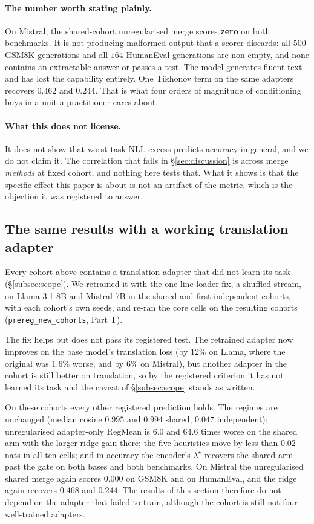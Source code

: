 \paragraph{The number worth stating plainly.} On Mistral, the shared-cohort
unregularised merge scores \textbf{zero} on both benchmarks. It is not
producing malformed output that a scorer discards: all $500$ GSM8K generations
and all $164$ HumanEval generations are non-empty, and none contains an
extractable answer or passes a test. The model generates fluent text and has
lost the capability entirely. One Tikhonov term on the same adapters recovers
$0.462$ and $0.244$. That is what four orders of magnitude of conditioning buys
in a unit a practitioner cares about.

\paragraph{What this does not license.} It does not show that worst-task NLL
excess predicts accuracy in general, and we do not claim it. The correlation
that fails in \S\ref{sec:discussion} is across merge \emph{methods} at fixed
cohort, and nothing here tests that. What it shows is that the specific effect
this paper is about is not an artifact of the metric, which is the objection it
was registered to answer.


\subsection{The same results with a working translation adapter}
\label{subsec:translation-fix}

Every cohort above contains a translation adapter that did not learn its task
(\S\ref{subsec:scope}). We retrained it with the one-line loader fix, a
shuffled stream, on Llama-3.1-8B and Mistral-7B in the shared and first
independent cohorts, with each cohort's own seeds, and re-ran the core cells on
the resulting cohorts (\texttt{prereg\_new\_cohorts}, Part T).

The fix helps but does not pass its registered test. The retrained adapter now
improves on the base model's translation loss (by $12\%$ on Llama, where the
original was $1.6\%$ worse, and by $6\%$ on Mistral), but another adapter in the
cohort is still better on translation, so by the registered criterion it has
not learned its task and the caveat of \S\ref{subsec:scope} stands as written.

On these cohorts every other registered prediction holds. The regimes are
unchanged (median cosine $0.995$ and $0.994$ shared, $0.047$ independent);
unregularised adapter-only RegMean is $6.0$ and $64.6$ times worse on the shared
arm with the larger ridge gain there; the five heuristics move by less than
$0.02$ nats in all ten cells; and in accuracy the encoder's $\lambda^\star$
recovers the shared arm past the gate on both bases and both benchmarks. On
Mistral the unregularised shared merge again scores $0.000$ on GSM8K and on
HumanEval, and the ridge again recovers $0.468$ and $0.244$. The results of this
section therefore do not depend on the adapter that failed to train, although
the cohort is still not four well-trained adapters.

